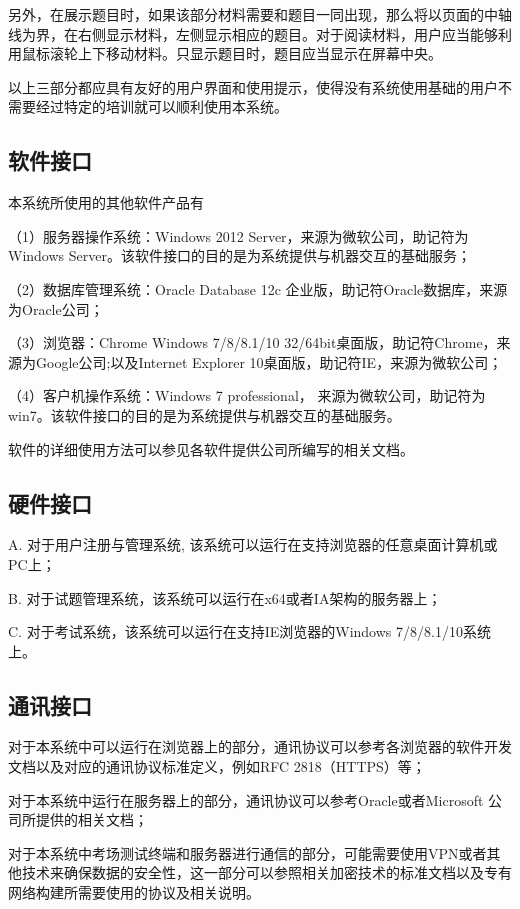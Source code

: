 另外，在展示题目时，如果该部分材料需要和题目一同出现，那么将以页面的中轴线为界，在右侧显示材料，左侧显示相应的题目。对于阅读材料，用户应当能够利用鼠标滚轮上下移动材料。只显示题目时，题目应当显示在屏幕中央。

以上三部分都应具有友好的用户界面和使用提示，使得没有系统使用基础的用户不需要经过特定的培训就可以顺利使用本系统。

\subsection{软件接口}
本系统所使用的其他软件产品有

（1）服务器操作系统：Windows 2012 Server，来源为微软公司，助记符为Windows Server。该软件接口的目的是为系统提供与机器交互的基础服务；

（2）数据库管理系统：Oracle Database 12c 企业版，助记符Oracle数据库，来源为Oracle公司；

（3）浏览器：Chrome Windows 7/8/8.1/10 32/64bit桌面版，助记符Chrome，来源为Google公司;以及Internet Explorer 10桌面版，助记符IE，来源为微软公司；

（4）客户机操作系统：Windows 7 professional， 来源为微软公司，助记符为win7。该软件接口的目的是为系统提供与机器交互的基础服务。

软件的详细使用方法可以参见各软件提供公司所编写的相关文档。

\subsection{硬件接口}
A. 对于用户注册与管理系统, 该系统可以运行在支持浏览器的任意桌面计算机或PC上；

B. 对于试题管理系统，该系统可以运行在x64或者IA架构的服务器上；

C. 对于考试系统，该系统可以运行在支持IE浏览器的Windows 7/8/8.1/10系统上。

\subsection{通讯接口}
对于本系统中可以运行在浏览器上的部分，通讯协议可以参考各浏览器的软件开发文档以及对应的通讯协议标准定义，例如RFC 2818（HTTPS）等；

对于本系统中运行在服务器上的部分，通讯协议可以参考Oracle或者Microsoft
公司所提供的相关文档；

对于本系统中考场测试终端和服务器进行通信的部分，可能需要使用VPN或者其他技术来确保数据的安全性，这一部分可以参照相关加密技术的标准文档以及专有网络构建所需要使用的协议及相关说明。
